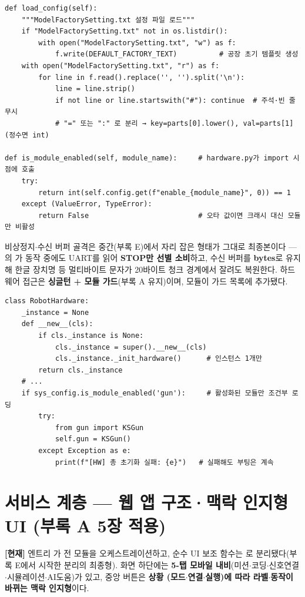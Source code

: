 \begin{verbatim}
def load_config(self):
    """ModelFactorySetting.txt 설정 파일 로드"""
    if "ModelFactorySetting.txt" not in os.listdir():
        with open("ModelFactorySetting.txt", "w") as f:
            f.write(DEFAULT_FACTORY_TEXT)          # 공장 초기 템플릿 생성
    with open("ModelFactorySetting.txt", "r") as f:
        for line in f.read().replace('﻿', '').split('\n'):
            line = line.strip()
            if not line or line.startswith("#"): continue  # 주석·빈 줄 무시
            # "=" 또는 ":" 로 분리 → key=parts[0].lower(), val=parts[1](정수면 int)

def is_module_enabled(self, module_name):     # hardware.py가 import 시점에 호출
    try:
        return int(self.config.get(f"enable_{module_name}", 0)) == 1
    except (ValueError, TypeError):
        return False                          # 오타 값이면 크래시 대신 모듈만 비활성
\end{verbatim}

\noindent 비상정지$\cdot$수신 버퍼 골격은 중간(부록 E)에서 자리 잡은 형태가 그대로 최종본이다 ---
의 가 동작 중에도 UART를 읽어 \textbf{STOP만 선별 소비}하고,
수신 버퍼를 \textbf{bytes}로 유지해 한글 장치명 등 멀티바이트 문자가 20바이트 청크 경계에서
잘려도 복원한다. 하드웨어 접근은 \textbf{싱글턴  + 모듈 가드}(부록 A 유지)이며,
 모듈이 가드 목록에 추가됐다.

\begin{verbatim}
class RobotHardware:
    _instance = None
    def __new__(cls):
        if cls._instance is None:
            cls._instance = super().__new__(cls)
            cls._instance._init_hardware()      # 인스턴스 1개만
        return cls._instance
    # ...
    if sys_config.is_module_enabled('gun'):     # 활성화된 모듈만 조건부 로딩
        try:
            from gun import KSGun
            self.gun = KSGun()
        except Exception as e:
            print(f"[HW] 총 초기화 실패: {e}")   # 실패해도 부팅은 계속
\end{verbatim}

\section{서비스 계층 --- 웹 앱 구조·맥락 인지형 UI (부록 A 5장 적용)}
\textbf{[현재]} 엔트리 가 전 모듈을 오케스트레이션하고, 순수 UI 보조 함수는
로 분리됐다(부록 E에서 시작한 분리의 최종형). 화면 하단에는 \textbf{5-탭 모바일
내비}(미션$\cdot$코딩$\cdot$신호연결$\cdot$시뮬레이션$\cdot$AI도움)가 있고, 중앙 버튼은 \textbf{상황
(모드$\cdot$연결$\cdot$실행)에 따라 라벨$\cdot$동작이 바뀌는 맥락 인지형}이다.


